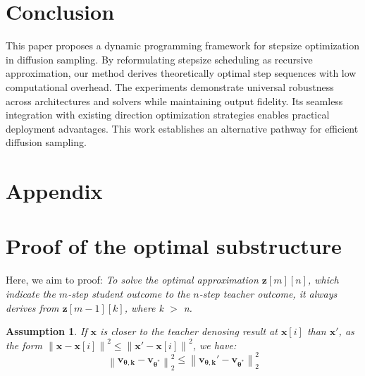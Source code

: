 \documentclass[10pt,twocolumn,letterpaper]{article}
\newcommand{\norm}[1]{\left\lVert#1\right\rVert}
\newtheorem{assumption}{Assumption}
\begin{document}
     \section{Conclusion}
This paper proposes a dynamic programming framework for stepsize optimization in diffusion sampling. By reformulating stepsize scheduling as recursive approximation, our method derives theoretically optimal step sequences with low computational overhead. The experiments demonstrate universal robustness across architectures and solvers while maintaining output fidelity. Its seamless integration with existing direction optimization strategies enables practical deployment advantages. This work establishes an alternative pathway for efficient diffusion sampling. 
\clearpage


{
    \small
    
    
}





\clearpage
\setcounter{section}{0}
\renewcommand{\thesection}{\Alph{section}}

\section*{Appendix}\label{sec:appendix}



    \section{Proof of the optimal substructure}\label{sec:optimal}
        Here, we aim to proof: 
        \emph{To solve the optimal approximation $\bm{z}[m][n]$, which indicate the $m$-step student outcome to the $n$-step teacher outcome, it always derives from $\bm{z}[m-1][k]$, where k $>$ n.}


    \begin{assumption}
        \label{assump} If $\bm{x}$ is closer to the teacher denosing result at $\bm{x}[i]$ than $\bm{x'}$, as the form
        $\norm{\bm{x} - \bm{x}[i]}^{2}\leq \norm{\bm{x'} - \bm{x}[i]}
        ^{2}$, we have:
        \begin{equation}
            \norm{\bm{v_{\theta,k}} - \bm{v_{\theta^*}}}^{2}_2\leq \norm{\bm{v_{\theta,k}'} - \bm{v_{\theta^*}}}
            ^{2}_2
        \end{equation}
    \end{assumption}

    
    
\end{document}
